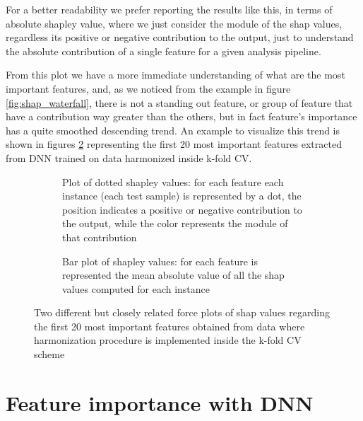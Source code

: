 \documentclass[10pt]{report}
\begin{document}
For a better readability we prefer reporting the results like this, in terms of absolute shapley value, where we just consider the module of the shap values, regardless its positive or negative contribution to the output, just to understand the absolute contribution of a single feature for a given analysis pipeline.

From this plot we have a more immediate understanding of what are the most important features, and, as we noticed from the example in figure \ref{fig:shap_waterfall}, there is not a standing out feature, or group of feature that have a contribution way greater than the others, but in fact feature's importance has a quite smoothed descending trend.
An example to visualize this trend is shown in figures \ref{fig:shap_bar_kfold} representing the first 20 most important features extracted from DNN trained on data harmonized inside k-fold CV.

\begin{figure}[h!]
\centering
\begin{subfigure}[t]{.45\linewidth}
   \caption{Plot of dotted shapley values: for each feature each instance (each test sample) is represented by a dot, the position indicates a positive or negative contribution to the output, while the color represents the module of that contribution}
   \label{fig:shap_dot_kfold}
\end{subfigure}
\hspace{3mm}
\begin{subfigure}[t]{.439\linewidth}
   \caption{Bar plot of shapley values: for each feature is represented the mean absolute value of all the shap values computed for each instance}
   \label{fig:shap_bar_kfold}
\end{subfigure}
\caption{Two different but closely related force plots of shap values regarding the first 20 most important features obtained from data where harmonization procedure is implemented inside the k-fold CV scheme
}
\label{fig:shap_features_kfold_both}
\end{figure}





\newpage
\section{Feature importance with DNN}\label{sec:feature_importance_dnn} \hfill
\end{document}

